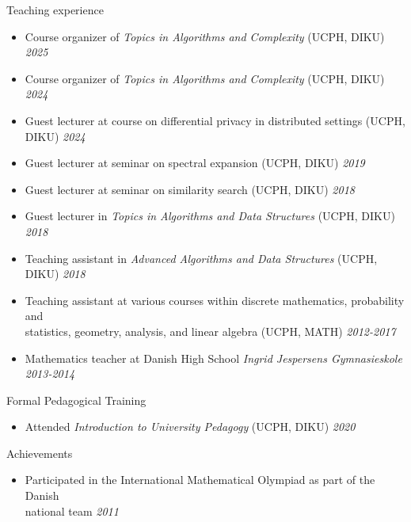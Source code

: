 \documentclass{resume} %
\begin{document}
\begin{rSection}{Teaching experience}
 \begin{itemize}
 \item Course organizer of \emph{Topics in Algorithms and Complexity} (UCPH, DIKU) \hfill{\emph{2025}}
 \item Course organizer of \emph{Topics in Algorithms and Complexity} (UCPH, DIKU) \hfill{\emph{2024}}
 \item Guest lecturer at course on differential privacy in distributed settings (UCPH, DIKU) \hfill{\emph{2024}}
 \item Guest lecturer at seminar on spectral expansion (UCPH, DIKU) \hfill{\emph{2019}}
 \item Guest lecturer at seminar on similarity search (UCPH, DIKU) \hfill{\emph{2018}}
 \item Guest lecturer in \emph{Topics in Algorithms and Data Structures} (UCPH, DIKU) \hfill{\emph{2018}}
 \item Teaching assistant in \emph{Advanced Algorithms and Data Structures} (UCPH, DIKU) \hfill{\emph{2018}}
 \item Teaching assistant at various courses within discrete mathematics, probability and \\ statistics, geometry, analysis, and linear algebra (UCPH, MATH) \hfill{\emph{2012-2017}}
 \item Mathematics teacher at Danish High School \emph{Ingrid Jespersens Gymnasieskole} \hfill{\emph{2013-2014}}
 \end{itemize}
 \end{rSection}

 \begin{rSection}{Formal Pedagogical Training}
 \begin{itemize}
  \item  Attended \emph{Introduction to University Pedagogy} (UCPH, DIKU) \hfill{\emph{2020}}
 \end{itemize}
 \end{rSection}

\begin{rSection}{Achievements}
\begin{itemize}
\item Participated in the International Mathematical Olympiad as part of the Danish \\ national team  \hfill{\emph{2011}}
\end{itemize}
\end{rSection}
\end{document}
